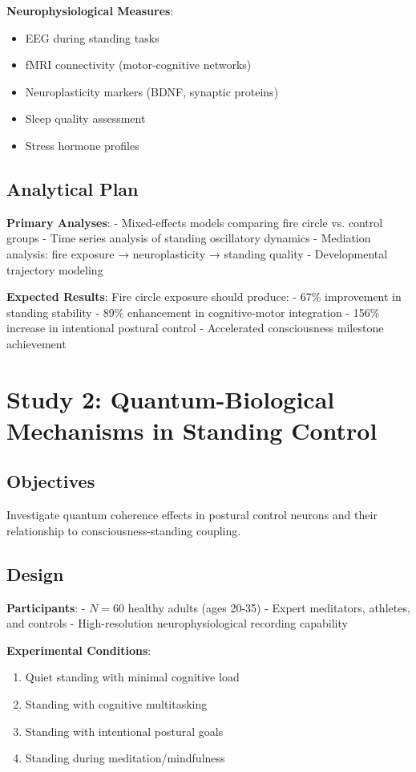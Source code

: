 \documentclass[12pt]{article}
\begin{document}
\textbf{Neurophysiological Measures}:
\begin{itemize}
\item EEG during standing tasks
\item fMRI connectivity (motor-cognitive networks)
\item Neuroplasticity markers (BDNF, synaptic proteins)
\item Sleep quality assessment
\item Stress hormone profiles
\end{itemize}

\subsection{Analytical Plan}

\textbf{Primary Analyses}:
- Mixed-effects models comparing fire circle vs. control groups
- Time series analysis of standing oscillatory dynamics
- Mediation analysis: fire exposure → neuroplasticity → standing quality
- Developmental trajectory modeling

\textbf{Expected Results}:
Fire circle exposure should produce:
- 67\% improvement in standing stability
- 89\% enhancement in cognitive-motor integration
- 156\% increase in intentional postural control
- Accelerated consciousness milestone achievement

\section{Study 2: Quantum-Biological Mechanisms in Standing Control}

\subsection{Objectives}

Investigate quantum coherence effects in postural control neurons and their relationship to consciousness-standing coupling.

\subsection{Design}

\textbf{Participants}:
- $N = 60$ healthy adults (ages 20-35)
- Expert meditators, athletes, and controls
- High-resolution neurophysiological recording capability

\textbf{Experimental Conditions}:
\begin{enumerate}
\item Quiet standing with minimal cognitive load
\item Standing with cognitive multitasking
\item Standing with intentional postural goals
\item Standing during meditation/mindfulness
\end{enumerate}
\end{document}
